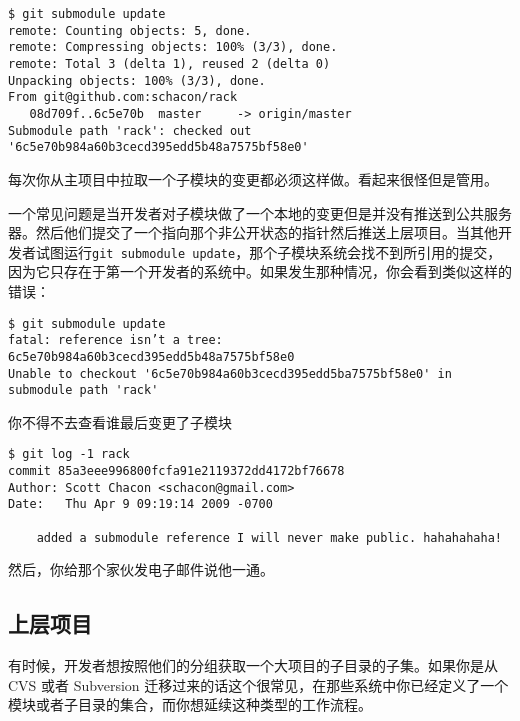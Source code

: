 \documentclass[a4paper]{book}
\begin{document}
\begin{shaded}\begin{verbatim}
$ git submodule update
remote: Counting objects: 5, done.
remote: Compressing objects: 100% (3/3), done.
remote: Total 3 (delta 1), reused 2 (delta 0)
Unpacking objects: 100% (3/3), done.
From git@github.com:schacon/rack
   08d709f..6c5e70b  master     -> origin/master
Submodule path 'rack': checked out '6c5e70b984a60b3cecd395edd5b48a7575bf58e0'
\end{verbatim}\end{shaded}

每次你从主项目中拉取一个子模块的变更都必须这样做。看起来很怪但是管用。

一个常见问题是当开发者对子模块做了一个本地的变更但是并没有推送到公共服务器。然后他们提交了一个指向那个非公开状态的指针然后推送上层项目。当其他开发者试图运行\texttt{git submodule update}，那个子模块系统会找不到所引用的提交，因为它只存在于第一个开发者的系统中。如果发生那种情况，你会看到类似这样的错误：

\begin{shaded}\begin{verbatim}
$ git submodule update
fatal: reference isn’t a tree: 6c5e70b984a60b3cecd395edd5b48a7575bf58e0
Unable to checkout '6c5e70b984a60b3cecd395edd5ba7575bf58e0' in submodule path 'rack'
\end{verbatim}\end{shaded}

你不得不去查看谁最后变更了子模块

\begin{shaded}\begin{verbatim}
$ git log -1 rack
commit 85a3eee996800fcfa91e2119372dd4172bf76678
Author: Scott Chacon <schacon@gmail.com>
Date:   Thu Apr 9 09:19:14 2009 -0700

    added a submodule reference I will never make public. hahahahaha!
\end{verbatim}\end{shaded}

然后，你给那个家伙发电子邮件说他一通。

\subsection{上层项目}

有时候，开发者想按照他们的分组获取一个大项目的子目录的子集。如果你是从 CVS 或者 Subversion 迁移过来的话这个很常见，在那些系统中你已经定义了一个模块或者子目录的集合，而你想延续这种类型的工作流程。
\end{document}
